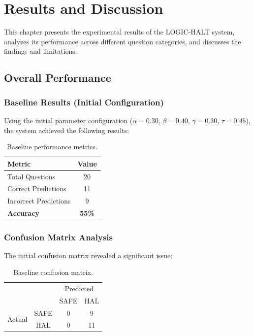 \chapter{Results and Discussion}

This chapter presents the experimental results of the LOGIC-HALT system, analyzes its performance across different question categories, and discusses the findings and limitations.

\section{Overall Performance}

\subsection{Baseline Results (Initial Configuration)}

Using the initial parameter configuration ($\alpha=0.30$, $\beta=0.40$, $\gamma=0.30$, $\tau=0.45$), the system achieved the following results:

\begin{table}[!htbp]
    \centering
    \caption{Baseline performance metrics.}
    \label{tab:baseline}
    \begin{tabular}{lc}
        \toprule
        Metric & Value \\
        \midrule
        Total Questions & 20 \\
        Correct Predictions & 11 \\
        Incorrect Predictions & 9 \\
        \textbf{Accuracy} & \textbf{55\%} \\
        \bottomrule
    \end{tabular}
\end{table}

\subsection{Confusion Matrix Analysis}

The initial confusion matrix revealed a significant issue:

\begin{table}[!htbp]
    \centering
    \caption{Baseline confusion matrix.}
    \label{tab:confusion_baseline}
    \begin{tabular}{cc|cc}
        & & \multicolumn{2}{c}{Predicted} \\
        & & SAFE & HAL \\
        \hline
        \multirow{2}{*}{Actual} & SAFE & 0 & 9 \\
        & HAL & 0 & 11 \\
    \end{tabular}
\end{table}

